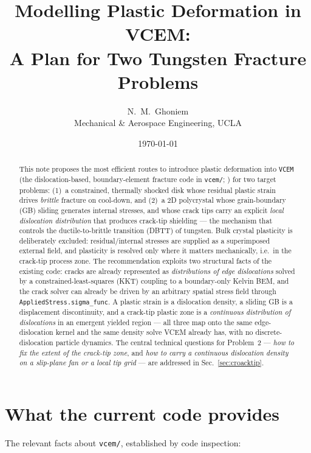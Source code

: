 \documentclass[11pt]{article}
\title{\textbf{Modelling Plastic Deformation in VCEM:\\
A Plan for Two Tungsten Fracture Problems}}
\author{N.\ M.\ Ghoniem \\ \small Mechanical \& Aerospace Engineering, UCLA}
\date{\today}
\begin{document}
\maketitle

\begin{abstract}
This note proposes the most efficient routes to introduce plastic deformation
into \texttt{VCEM} (the dislocation-based, boundary-element fracture code in
\texttt{vcem/}; \citealp{Ghoniem2026VCEMa,Ghoniem2026VCEMb}) for two target problems:
(1)~a constrained, thermally shocked disk whose residual plastic strain drives
\emph{brittle} fracture on cool-down, and
(2)~a 2D polycrystal whose grain-boundary (GB) sliding generates internal
stresses, and whose crack tips carry an explicit \emph{local dislocation
distribution} that produces crack-tip shielding --- the mechanism that controls
the ductile-to-brittle transition (DBTT) of tungsten. Bulk crystal plasticity
is deliberately excluded: residual/internal stresses are supplied as a
superimposed external field, and plasticity is resolved only where it matters
mechanically, i.e.\ in the crack-tip process zone. The recommendation exploits
two structural facts of the existing code: cracks are already represented as
\emph{distributions of edge dislocations} solved by a constrained-least-squares
(KKT) coupling to a boundary-only Kelvin BEM, and the crack solver can already
be driven by an arbitrary spatial stress field through
\texttt{AppliedStress.sigma\_func}. A plastic strain is a dislocation density, a
sliding GB is a displacement discontinuity, and a crack-tip plastic zone is a
\emph{continuous distribution of dislocations} in an emergent yielded region ---
all three map onto the same edge-dislocation kernel and the same density solve
VCEM already has, with no discrete-dislocation particle dynamics. The central
technical questions for Problem~2 --- \emph{how to fix the extent of the
crack-tip zone}, and \emph{how to carry a continuous dislocation density on a
slip-plane fan or a local tip grid} --- are addressed in
Sec.~\ref{sec:croacktip}.
\end{abstract}

\tableofcontents

\section{What the current code provides}
\label{sec:current}

The relevant facts about \texttt{vcem/}, established by code inspection:
\end{document}
